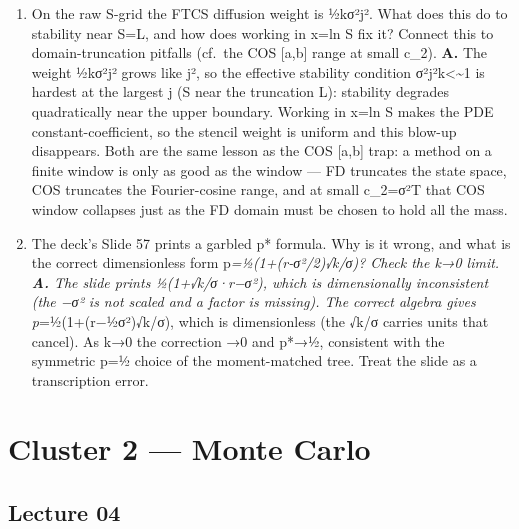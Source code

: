 \documentclass[
  11pt,
]{article}
\begin{document}
\begin{enumerate}
  customised to a single time-zero value''? What does a general FD
  scheme give that the tree throws away? \textbf{A.} The recursion above
  is exactly the risk-neutral binomial backward step (up-prob p\emph{,
  log-spacing ±σ√k), i.e.~an explicit FD scheme on the transformed heat
  equation, ``customised'' via h²=σ²k so the centre node drops out and
  only the two branches remain. The tree returns only V\_0\^{}0 (one
  spot). A general FD scheme returns the value at }every* grid node
  \{jh,ik\}, hence prices for all initial spots at once --- that
  whole-grid information is what the tree discards.
\item
  On the raw S-grid the FTCS diffusion weight is ½kσ²j². What does this
  do to stability near S=L, and how does working in x=ln S fix it?
  Connect this to domain-truncation pitfalls (cf.~the COS {[}a,b{]}
  range at small c\_2). \textbf{A.} The weight ½kσ²j² grows like j², so
  the effective stability condition σ²j²k\textless\textasciitilde1 is
  hardest at the largest j (S near the truncation L): stability degrades
  quadratically near the upper boundary. Working in x=ln S makes the PDE
  constant-coefficient, so the stencil weight is uniform and this
  blow-up disappears. Both are the same lesson as the COS {[}a,b{]}
  trap: a method on a finite window is only as good as the window --- FD
  truncates the state space, COS truncates the Fourier-cosine range, and
  at small c\_2=σ²T that COS window collapses just as the FD domain must
  be chosen to hold all the mass.
\item
  The deck's Slide 57 prints a garbled p* formula. Why is it wrong, and
  what is the correct dimensionless form p\emph{=½(1+(r-σ²/2)√k/σ)?
  Check the k→0 limit. \textbf{A.} The slide prints ½(1+√k/σ·r−σ²),
  which is dimensionally inconsistent (the −σ² is not scaled and a
  factor is missing). The correct algebra gives p}=½(1+(r−½σ²)√k/σ),
  which is dimensionless (the √k/σ carries units that cancel). As k→0
  the correction →0 and p*→½, consistent with the symmetric p=½ choice
  of the moment-matched tree. Treat the slide as a transcription error.
\end{enumerate}

\hypertarget{cluster-2-monte-carlo}{%
\section{Cluster 2 --- Monte Carlo}\label{cluster-2-monte-carlo}}

\hypertarget{lecture-04}{%
\subsection{Lecture 04}\label{lecture-04}}
\end{document}
